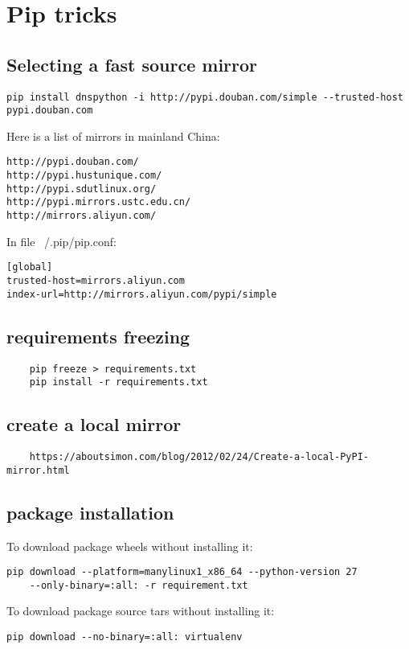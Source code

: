 \section{Pip tricks}


\subsection{Selecting a fast source mirror}

\begin{verbatim}
pip install dnspython -i http://pypi.douban.com/simple --trusted-host pypi.douban.com
\end{verbatim}

Here is a list of mirrors in mainland China:
\begin{verbatim}
http://pypi.douban.com/  
http://pypi.hustunique.com/  
http://pypi.sdutlinux.org/  
http://pypi.mirrors.ustc.edu.cn/  
http://mirrors.aliyun.com/
\end{verbatim}


In file  ~/.pip/pip.conf:

\begin{verbatim}
[global]
trusted-host=mirrors.aliyun.com
index-url=http://mirrors.aliyun.com/pypi/simple
\end{verbatim}

\subsection{requirements freezing}

\begin{verbatim}
    pip freeze > requirements.txt
    pip install -r requirements.txt
\end{verbatim}

\subsection{create a local mirror}

\begin{verbatim}
    https://aboutsimon.com/blog/2012/02/24/Create-a-local-PyPI-mirror.html
\end{verbatim}

\subsection{package installation}

To download package wheels without installing it:
\begin{verbatim}
pip download --platform=manylinux1_x86_64 --python-version 27 
    --only-binary=:all: -r requirement.txt
\end{verbatim}
To download package source tars without installing it:
\begin{verbatim}
pip download --no-binary=:all: virtualenv
\end{verbatim}

